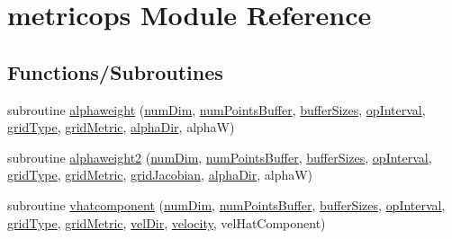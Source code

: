 \hypertarget{namespacemetricops}{}\section{metricops Module Reference}
\label{namespacemetricops}
\subsection*{Functions/\+Subroutines}
\begin{DoxyCompactItemize}
\item 
subroutine \hyperlink{namespacemetricops_ac9382d1e722d0417169f5a2f160ebfc7}{alphaweight} (\hyperlink{SATKernels_8H_a680185db8546de161968dabace9e94f1}{num\+Dim}, \hyperlink{WENOKernels_8H_a86c25ff33e6d9bccfabdf45dc5ddf24c}{num\+Points\+Buffer}, \hyperlink{WENOKernels_8H_a302023d425dc22c2c647b4f9d8c78b0b}{buffer\+Sizes}, \hyperlink{WENOKernels_8H_a23d86f4608a92738225f87574392b273}{op\+Interval}, \hyperlink{WENOKernels_8H_ab35a6cf312bb0fddda7097a149c3e946}{grid\+Type}, \hyperlink{WENOKernels_8H_a901f07fa4e3f966a2f6951d6c5974e89}{grid\+Metric}, \hyperlink{MetricKernels_8H_a3d083d604bcbd48cccc0421f5328f574}{alpha\+Dir}, alphaW)
\item 
subroutine \hyperlink{namespacemetricops_abf449970c4b90017443108f34a3cf4d0}{alphaweight2} (\hyperlink{SATKernels_8H_a680185db8546de161968dabace9e94f1}{num\+Dim}, \hyperlink{WENOKernels_8H_a86c25ff33e6d9bccfabdf45dc5ddf24c}{num\+Points\+Buffer}, \hyperlink{WENOKernels_8H_a302023d425dc22c2c647b4f9d8c78b0b}{buffer\+Sizes}, \hyperlink{WENOKernels_8H_a23d86f4608a92738225f87574392b273}{op\+Interval}, \hyperlink{WENOKernels_8H_ab35a6cf312bb0fddda7097a149c3e946}{grid\+Type}, \hyperlink{WENOKernels_8H_a901f07fa4e3f966a2f6951d6c5974e89}{grid\+Metric}, \hyperlink{SATKernels_8H_aaf1e04690bc21cac2a406748b963e345}{grid\+Jacobian}, \hyperlink{MetricKernels_8H_a3d083d604bcbd48cccc0421f5328f574}{alpha\+Dir}, alphaW)
\item 
subroutine \hyperlink{namespacemetricops_af0813d14ff29789b3c8f479b4bcecd3d}{vhatcomponent} (\hyperlink{SATKernels_8H_a680185db8546de161968dabace9e94f1}{num\+Dim}, \hyperlink{WENOKernels_8H_a86c25ff33e6d9bccfabdf45dc5ddf24c}{num\+Points\+Buffer}, \hyperlink{WENOKernels_8H_a302023d425dc22c2c647b4f9d8c78b0b}{buffer\+Sizes}, \hyperlink{WENOKernels_8H_a23d86f4608a92738225f87574392b273}{op\+Interval}, \hyperlink{WENOKernels_8H_ab35a6cf312bb0fddda7097a149c3e946}{grid\+Type}, \hyperlink{WENOKernels_8H_a901f07fa4e3f966a2f6951d6c5974e89}{grid\+Metric}, \hyperlink{MetricKernels_8H_a25df08ad943d494c17a8ce1d64a0da8f}{vel\+Dir}, \hyperlink{MetricKernels_8H_ac09ce3f593a19c2dae1fe2c3ac95a673}{velocity}, vel\+Hat\+Component)

\end{DoxyCompactItemize}
